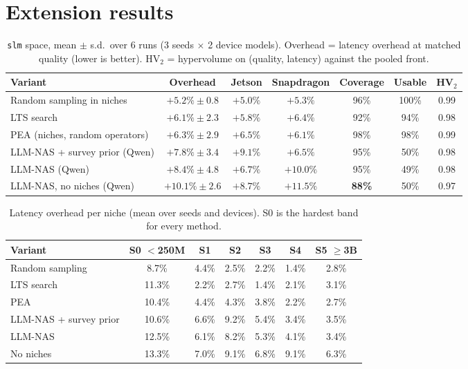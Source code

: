 \documentclass[11pt,a4paper]{article}
\newcommand{\code}[1]{\texttt{#1}}
\begin{document}
\section{Extension results}\label{sec:slmresults}

\begin{table}[h]\centering\small
\caption{\code{slm} space, mean $\pm$ s.d.\ over 6 runs (3 seeds $\times$ 2 device models). Overhead = latency overhead at matched quality (lower is better). HV$_2$ = hypervolume on (quality, latency) against the pooled front.}\label{tab:slm}
\begin{tabular}{lcccccc}
\toprule
Variant & Overhead & Jetson & Snapdragon & Coverage & Usable & HV$_2$ \\
\midrule
Random sampling in niches & $\mathbf{+5.2\%\pm0.8}$ & $+5.0\%$ & $+5.3\%$ & 96\% & 100\% & 0.99 \\
LTS search & $+6.1\%\pm2.3$ & $+5.8\%$ & $+6.4\%$ & 92\% & 94\% & 0.98 \\
PEA (niches, random operators) & $+6.3\%\pm2.9$ & $+6.5\%$ & $+6.1\%$ & 98\% & 98\% & 0.99 \\
LLM-NAS + survey prior (Qwen) & $+7.8\%\pm3.4$ & $+9.1\%$ & $+6.5\%$ & 95\% & 50\% & 0.98 \\
LLM-NAS (Qwen) & $+8.4\%\pm4.8$ & $+6.7\%$ & $+10.0\%$ & 95\% & 49\% & 0.98 \\
LLM-NAS, no niches (Qwen) & $+10.1\%\pm2.6$ & $+8.7\%$ & $+11.5\%$ & \textbf{88\%} & 50\% & 0.97 \\
\bottomrule
\end{tabular}
\end{table}

\begin{table}[h]\centering\small
\caption{Latency overhead per niche (mean over seeds and devices). S0 is the hardest band for every method.}\label{tab:niche}
\begin{tabular}{lcccccc}
\toprule
Variant & S0 $<$250M & S1 & S2 & S3 & S4 & S5 $\ge$3B \\
\midrule
Random sampling & 8.7\% & 4.4\% & 2.5\% & 2.2\% & 1.4\% & 2.8\% \\
LTS search & 11.3\% & 2.2\% & 2.7\% & 1.4\% & 2.1\% & 3.1\% \\
PEA & 10.4\% & 4.4\% & 4.3\% & 3.8\% & 2.2\% & 2.7\% \\
LLM-NAS + survey prior & 10.6\% & 6.6\% & 9.2\% & 5.4\% & 3.4\% & 3.5\% \\
LLM-NAS & 12.5\% & 6.1\% & 8.2\% & 5.3\% & 4.1\% & 3.4\% \\
No niches & 13.3\% & 7.0\% & 9.1\% & 6.8\% & 9.1\% & 6.3\% \\
\bottomrule
\end{tabular}
\end{table}
\end{document}
